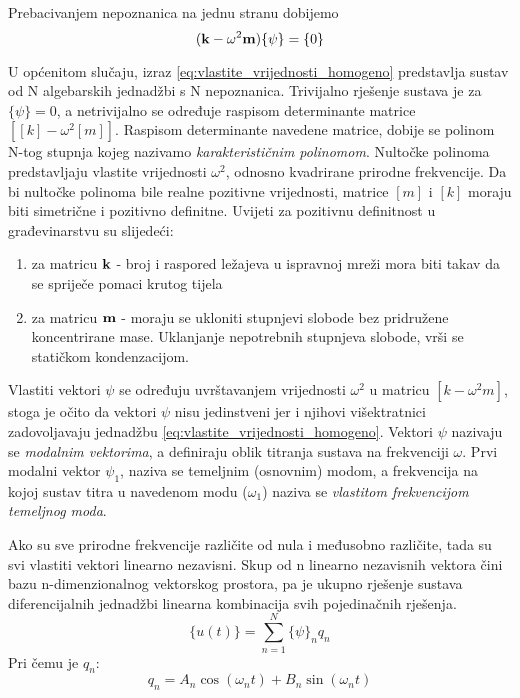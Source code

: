 Prebacivanjem nepoznanica na jednu stranu dobijemo
\begin{equation}\label{eq:vlastite_vrijednosti_homogeno}
    (\mathbf{k}-\omega^2\mathbf{m})\{\psi\}=\{0\}
\end{equation}

U općenitom slučaju, izraz \eqref{eq:vlastite_vrijednosti_homogeno} predstavlja
sustav od N algebarskih jednadžbi s N nepoznanica. Trivijalno rješenje sustava je za
$\{\psi\}={0}$, a netrivijalno se određuje raspisom determinante matrice
$[[k]-\omega^2[m]]$. Raspisom determinante navedene matrice, dobije se polinom N-tog
stupnja kojeg nazivamo \textit{karakterističnim polinomom}. Nultočke polinoma
predstavljaju vlastite vrijednosti $\omega^2$, odnosno kvadrirane prirodne
frekvencije. Da bi nultočke polinoma bile realne pozitivne vrijednosti, matrice $[m]$
i $[k]$ moraju biti simetrične i pozitivno definitne. Uvijeti za pozitivnu
definitnost u građevinarstvu su slijedeći:
\begin{enumerate}
    \item za matricu $\mathbf{k}$ - broj i raspored ležajeva u ispravnoj mreži mora biti
        takav da se spriječe pomaci krutog tijela
    \item za matricu $\mathbf{m}$ - moraju se ukloniti stupnjevi slobode bez pridružene
        koncentrirane mase. Uklanjanje nepotrebnih stupnjeva slobode, vrši se
        statičkom kondenzacijom.
\end{enumerate}

Vlastiti vektori $\psi$ se određuju uvrštavanjem vrijednosti $\omega^2$ u matricu
$[k-\omega^2m]$, stoga je očito da vektori $\psi$ nisu jedinstveni jer i njihovi
višektratnici zadovoljavaju jednadžbu \eqref{eq:vlastite_vrijednosti_homogeno}.
Vektori $\psi$ nazivaju se \textit{modalnim vektorima}, a definiraju oblik titranja
sustava na frekvenciji $\omega$. Prvi modalni vektor $\psi_1$, naziva se temeljnim
(osnovnim) modom, a frekvencija na kojoj sustav titra u navedenom modu ($\omega_1$)
naziva se \textit{vlastitom frekvencijom temeljnog moda}.
\par

Ako su sve prirodne frekvencije različite od nula i međusobno različite, tada su svi
vlastiti vektori linearno nezavisni. Skup od n linearno nezavisnih vektora čini bazu
n-dimenzionalnog vektorskog prostora, pa je ukupno rješenje sustava diferencijalnih
jednadžbi linearna kombinacija svih pojedinačnih rješenja.
\begin{equation}\label{eq:opce_rjesenje_sustava}
    \{u(t)\}=\sum_{n=1}^N\{\psi\}_nq_n 
\end{equation}
Pri čemu je $q_n$:
\begin{equation}
    q_n=A_n\cos(\omega_n t) + B_n\sin(\omega_n t)
\end{equation}

